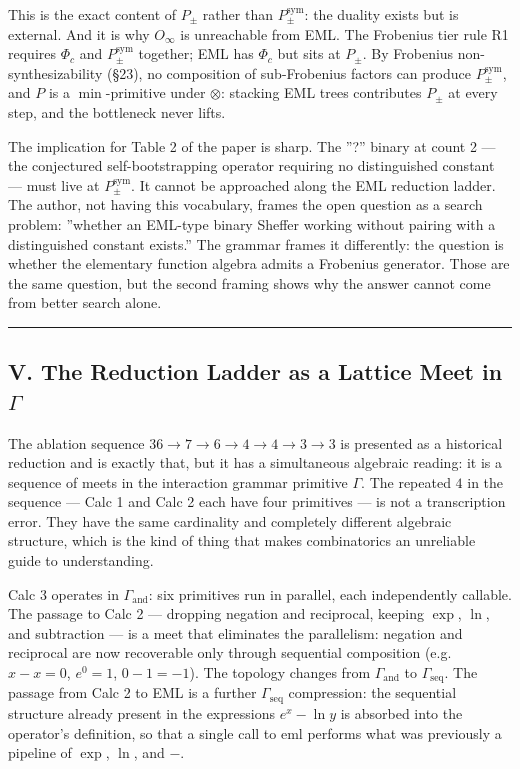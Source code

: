\documentclass[12pt,a4paper]{article}
\newcommand{\pilcrow}{\S}
\begin{document}
This is the exact content of $P_{\pm}$ rather than $P_{\pm}^{\text{sym}}$: the
duality exists but is external. And it is why $O_{\infty}$ is unreachable from
EML. The Frobenius tier rule R1 requires $\Phi_c$ and $P_{\pm}^{\text{sym}}$
together; EML has $\Phi_c$ but sits at $P_{\pm}$. By Frobenius non-synthesizability
(\pilcrow{}23), no composition of sub-Frobenius factors can produce $P_{\pm}^{\text{sym}}$,
and $P$ is a $\min$-primitive under $\otimes$: stacking EML trees contributes
$P_{\pm}$ at every step, and the bottleneck never lifts.

The implication for Table 2 of the paper is sharp. The ''?'' binary at count 2 ---
the conjectured self-bootstrapping operator requiring no distinguished constant ---
must live at $P_{\pm}^{\text{sym}}$. It cannot be approached along the EML
reduction ladder. The author, not having this vocabulary, frames the open question
as a search problem: ''whether an EML-type binary Sheffer working without pairing
with a distinguished constant exists.'' The grammar frames it differently: the
question is whether the elementary function algebra admits a Frobenius generator.
Those are the same question, but the second framing shows why the answer cannot
come from better search alone.

\begin{center}
\rule{0.5\textwidth}{0.4pt}
\end{center}

\subsection{V. The Reduction Ladder as a Lattice Meet in $\Gamma$}

The ablation sequence $36 \to 7 \to 6 \to 4 \to 4 \to 3 \to 3$ is presented as
a historical reduction and is exactly that, but it has a simultaneous algebraic
reading: it is a sequence of meets in the interaction grammar primitive $\Gamma$.
The repeated $4$ in the sequence --- Calc 1 and Calc 2 each have four primitives ---
is not a transcription error. They have the same cardinality and completely
different algebraic structure, which is the kind of thing that makes combinatorics
an unreliable guide to understanding.

Calc 3 operates in $\Gamma_\text{and}$: six primitives run in parallel, each
independently callable. The passage to Calc 2 --- dropping negation and reciprocal,
keeping $\exp$, $\ln$, and subtraction --- is a meet that eliminates the
parallelism: negation and reciprocal are now recoverable only through sequential
composition (e.g. $x - x = 0$, $e^0 = 1$, $0 - 1 = -1$). The topology changes
from $\Gamma_\text{and}$ to $\Gamma_\text{seq}$. The passage from Calc 2 to EML
is a further $\Gamma_\text{seq}$ compression: the sequential structure already
present in the expressions $e^x - \ln y$ is absorbed into the operator's
definition, so that a single call to $\text{eml}$ performs what was previously a
pipeline of $\exp$, $\ln$, and $-$.
\end{document}
